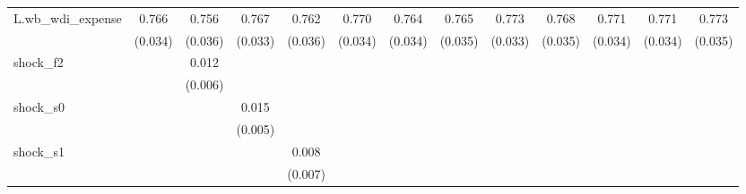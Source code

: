 {\begin{tabular}{l*{12}{c}}
\addlinespace
L.wb\_wdi\_expense&       0.766\sym{***}&       0.756\sym{***}&       0.767\sym{***}&       0.762\sym{***}&       0.770\sym{***}&       0.764\sym{***}&       0.765\sym{***}&       0.773\sym{***}&       0.768\sym{***}&       0.771\sym{***}&       0.771\sym{***}&       0.773\sym{***}\\
            &     (0.034)         &     (0.036)         &     (0.033)         &     (0.036)         &     (0.034)         &     (0.034)         &     (0.035)         &     (0.033)         &     (0.035)         &     (0.034)         &     (0.034)         &     (0.035)         \\
\addlinespace
shock\_f2    &                     &       0.012\sym{**} &                     &                     &                     &                     &                     &                     &                     &                     &                     &                     \\
            &                     &     (0.006)         &                     &                     &                     &                     &                     &                     &                     &                     &                     &                     \\
\addlinespace
shock\_s0    &                     &                     &       0.015\sym{***}&                     &                     &                     &                     &                     &                     &                     &                     &                     \\
            &                     &                     &     (0.005)         &                     &                     &                     &                     &                     &                     &                     &                     &                     \\
\addlinespace
shock\_s1    &                     &                     &                     &       0.008         &                     &                     &                     &                     &                     &                     &                     &                     \\
            &                     &                     &                     &     (0.007)         &                     &                     &                     &                     &                     &                     &                     &                     \\

\end{tabular}}
